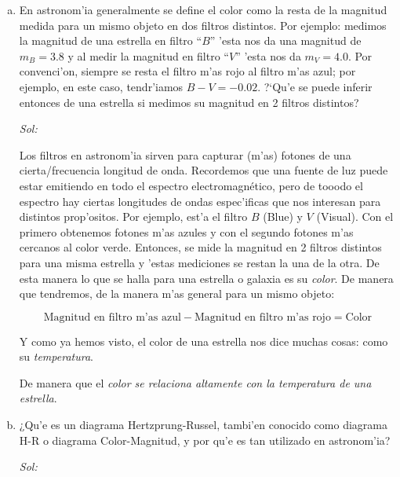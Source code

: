 \documentclass{article}
\begin{document}
\begin{enumerate}[a)]
\item En astronom'ia generalmente se define el color como la resta de la magnitud medida para un mismo objeto en dos filtros distintos. Por ejemplo: medimos la magnitud de una estrella en filtro ``$B$'' 'esta nos da una magnitud de $m_B = 3.8$ y al medir la magnitud en filtro ``$V$'' 'esta nos da $m_V = 4.0$. Por convenci'on, siempre se resta el filtro m'as rojo al filtro m'as azul; por ejemplo, en este caso, tendr'iamos $B-V = -0.02$. ?`Qu'e se puede inferir entonces de una estrella si medimos su magnitud en 2 filtros distintos?

\vspace{2mm}

\emph{Sol:}

\vspace{2mm}

Los filtros en astronom'ia sirven para capturar (m'as) fotones de una cierta/frecuencia longitud de onda. Recordemos que una fuente de luz puede estar emitiendo en todo el espectro electromagnético, pero de tooodo el espectro hay ciertas longitudes de ondas espec'ificas que nos interesan para distintos prop'ositos. Por ejemplo, est'a el filtro $B$ (Blue) y $V$ (Visual). Con el primero obtenemos fotones m'as azules y con el segundo fotones m'as cercanos al color verde. Entonces, se mide la magnitud en 2 filtros distintos para una misma estrella y 'estas mediciones se restan la una de la otra. De esta manera lo que se halla para una estrella o galaxia es su \emph{color}. De manera que tendremos, de la manera m'as general para un mismo objeto:

\begin{equation}
\text{Magnitud en filtro m'as azul} - \text{Magnitud en filtro m'as rojo} = \text{Color}
\end{equation}

Y como ya hemos visto, el color de una estrella nos dice muchas cosas: como su \emph{temperatura}.

De manera que el \emph{color se relaciona altamente con la temperatura de una estrella}.

\item ¿Qu'e es un diagrama Hertzprung-Russel, tambi'en conocido como diagrama H-R o diagrama Color-Magnitud, y por qu'e es tan utilizado en astronom'ia?

\vspace{2mm}

\emph{Sol:}

\vspace{2mm}


\end{enumerate}
\end{document}

